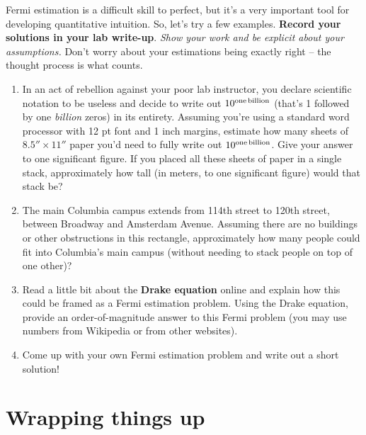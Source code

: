 \documentclass[11pt]{article}
\begin{document}
\medskip \noindent
Fermi estimation is a difficult skill to perfect, but it's a very important tool for developing quantitative intuition. So, let's try a few examples. \textbf{Record your solutions in your lab write-up}. \textit{Show your work and be explicit about your assumptions.} Don't worry about your estimations being exactly right -- the thought process is what counts.
\begin{enumerate}
    \item In an act of rebellion against your poor lab instructor, you declare scientific notation to be useless and decide to write out $10^{\rm one \, billion}$ (that's 1 followed by one \emph{billion} zeros) in its entirety. Assuming you're using a standard word processor with 12 pt font and 1 inch margins, estimate how many sheets of $8.5'' \times 11''$ paper you'd need to fully write out $10^{\rm one \, billion}$. Give your answer to one significant figure. If you placed all these sheets of paper in a single stack, approximately how tall (in meters, to one significant figure) would that stack be? 
    
    \item The main Columbia campus extends from 114th street to 120th street, between Broadway and Amsterdam Avenue. Assuming there are no buildings or other obstructions in this rectangle, approximately how many people could fit into Columbia's main campus (without needing to stack people on top of one other)? 
    
    \item Read a little bit about the \textbf{Drake equation} online and explain how this could be framed as a Fermi estimation problem. Using the Drake equation, provide an order-of-magnitude answer to this Fermi problem (you may use numbers from Wikipedia or from other websites). 
    
    \item Come up with your own Fermi estimation problem and write out a short solution!
\end{enumerate}

\section{Wrapping things up}
\end{document}
